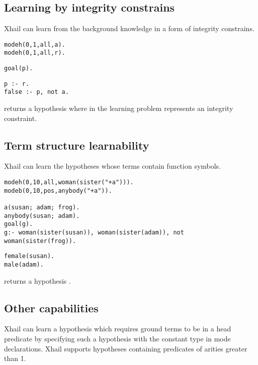 \subsection{Learning by integrity constrains}
Xhail can learn from the background knowledge in a form of integrity constrains.

\begin{minipage}[t]{.30\textwidth}
\begin{lstlisting}
modeh(0,1,all,a).
modeh(0,1,all,r).
\end{lstlisting}
\end{minipage}
\begin{minipage}[t]{.20\textwidth}
\begin{lstlisting}
goal(p).
\end{lstlisting}
\end{minipage}
\begin{minipage}[t]{.20\textwidth}
\begin{lstlisting}
p :- r.
false :- p, not a.
\end{lstlisting}
\end{minipage}

returns a hypothesis  where in the learning problem
 represents an integrity constraint.

\subsection{Term structure learnability}
Xhail can learn the hypotheses whose terms contain function symbols.

\begin{minipage}[t]{.60\textwidth}
\begin{lstlisting}
modeh(0,10,all,woman(sister("+a"))).
modeb(0,10,pos,anybody("+a")).

a(susan; adam; frog).
anybody(susan; adam).
goal(g).
g:- woman(sister(susan)), woman(sister(adam)), not woman(sister(frog)).
\end{lstlisting}
\end{minipage}
\begin{minipage}[t]{.20\textwidth}
\begin{lstlisting}
female(susan).
male(adam).
\end{lstlisting}
\end{minipage}

returns a hypothesis
.
\subsection{Other capabilities}
Xhail can learn a hypothesis which requires ground terms to be in a head predicate by specifying such a hypothesis with the constant type  in mode declarations. Xhail supports hypotheses containing predicates of arities greater than 1.

